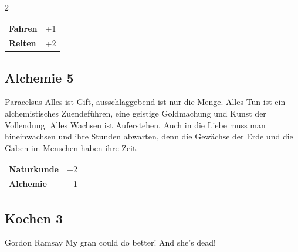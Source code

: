 \begin{multicols}{2}
\begin{tcolorbox}
\begin{tabular}{@{}ll@{}}
    \textbf{Fahren} & +1\\
    \textbf{Reiten} & +2\\
\end{tabular}


\end{tcolorbox}

\begin{tcolorbox}
    \subsection*{Alchemie \hfill \small{5 }}
    \tcblower


\begin{pquote}{Paracelsus}
Alles ist Gift, ausschlaggebend ist nur die Menge. Alles Tun ist ein alchemistisches Zuendeführen, eine geistige Goldmachung und Kunst der Vollendung. Alles Wachsen ist Auferstehen. Auch in die Liebe muss man hineinwachsen und ihre Stunden abwarten, denn die Gewächse der Erde und die Gaben im Menschen haben ihre Zeit.
\end{pquote}

\vspace{3mm}

\begin{tabular}{@{}ll@{}}
    \textbf{Naturkunde} & +2\\
    \textbf{Alchemie} & +1\\
\end{tabular}


\end{tcolorbox}

\begin{tcolorbox}
    \subsection*{Kochen \hfill \small{3 }}
    \tcblower


\begin{pquote}{Gordon Ramsay}
My gran could do better! And she’s dead!
\end{pquote}


\end{tcolorbox}
\end{multicols}
